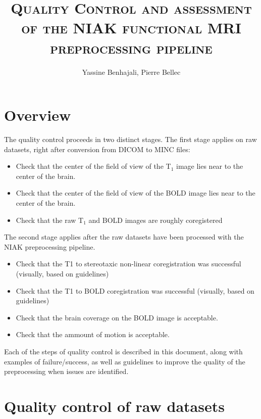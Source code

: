 \documentclass[12pt]{paper}%
\title {\textsc{Quality Control and assessment of the NIAK functional MRI preprocessing pipeline}}
\author{Yassine Benhajali, Pierre Bellec}
\begin{document}
\maketitle 
\hspace{5 cm}
\appendix

\section*{Overview}

The quality control proceeds in two distinct stages. The first stage applies on raw datasets, right after conversion from DICOM to MINC files: 
\begin{framed}
 \begin{itemize}
 \item Check that the center of the field of view of the T$_1$ image lies near to the center of the brain.
 \item Check that the center of the field of view of the BOLD image lies near to the center of the brain.
 \item Check that the raw T$_1$ and BOLD images are roughly coregistered 
 \end{itemize}
 \end{framed}
The second stage applies after the raw datasets have been processed with the NIAK preprocessing pipeline. 
\begin{framed}
 \begin{itemize}
 \item Check that the T1 to stereotaxic non-linear coregistration was successful (visually, based on guidelines)
 \item Check that the T1 to BOLD coregistration was successful (visually, based on guidelines)
 \item Check that the brain coverage on the BOLD image is acceptable.
 \item Check that the ammount of motion is acceptable.
 \end{itemize}
 \end{framed}
Each of the steps of quality control is described in this document, along with examples of failure/success, as well as guidelines to improve the quality of the preprocessing when issues are identified. 

\newpage
\section{Quality control of raw datasets}
\end{document}

